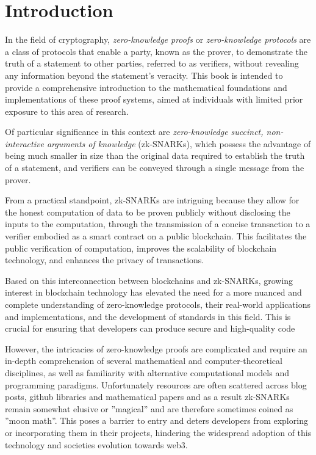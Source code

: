 \chapter{Introduction}
In the field of cryptography, \textit{zero-knowledge proofs} or \textit{zero-knowledge protocols} are a class of protocols that enable a party, known as the prover, to demonstrate the truth of a statement to other parties, referred to as verifiers, without revealing any information beyond the statement's veracity. This book is intended to provide a comprehensive introduction to the mathematical foundations and implementations of these proof systems, aimed at individuals with limited prior exposure to this area of research.

Of particular significance in this context are \textit{zero-knowledge succinct, non-interactive arguments of knowledge} (zk-SNARKs), which possess the advantage of being much smaller in size than the original data required to establish the truth of a statement, and verifiers can be conveyed through a single message from the prover.

From a practical standpoint, zk-SNARKs are intriguing because they allow for the honest computation of data to be proven publicly without disclosing the inputs to the computation, through the transmission of a concise transaction to a verifier embodied as a smart contract on a public blockchain. This facilitates the public verification of computation, improves the scalability of blockchain technology, and enhances the privacy of transactions.

Based on this interconnection between blockchains and zk-SNARKs, growing interest in blockchain technology has elevated the need for a more nuanced and complete understanding of zero-knowledge protocols, their real-world applications and implementations, and the development of standards in this field. This is crucial for ensuring that developers can produce secure and high-quality code

However, the intricacies of zero-knowledge proofs are complicated and require an in-depth comprehension of several mathematical and computer-theoretical disciplines, as well as familiarity with alternative computational models and programming paradigms. Unfortunately resources are often scattered across blog posts, github libraries and mathematical papers and as a result zk-SNARKs remain somewhat elusive or ''magical'' and are therefore sometimes coined as ''moon math''. This poses a barrier to entry and deters developers from exploring or incorporating them in their projects, hindering the widespread adoption of this technology and societies evolution towards web3.

